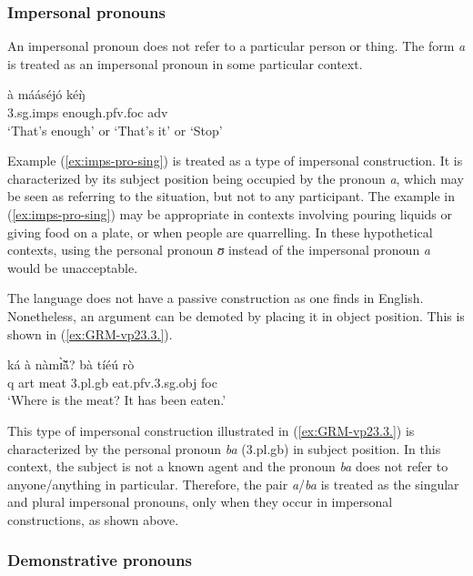 \begin{exe}
\begin{exe}
\begin{exe}
{\begin{exe}
\begin{exe}
\begin{exe}
\begin{exe}
\begin{exe}
\begin{exe}
\begin{exe}
\begin{xlist}
  
 \subsubsection{Impersonal pronouns}
 \label{sec:GRM-impers-pro}

An impersonal pronoun does  not refer to a particular person or thing. The form
{\it a} is treated as an impersonal pronoun  in some
particular context.

               
\begin{exe} 
\ex\label{ex:imps-pro-sing}
\gll à mááséjó kéŋ̀\\
     {\sc 3.sg.imps}  enough.{\sc pfv.foc} {\sc adv}\\
\glt `That's enough' or `That's it' or `Stop'
\z

Example (\ref{ex:imps-pro-sing}) is treated as a type of impersonal
construction. It is characterized by its  subject position being  occupied by 
the
pronoun {\it a}, which may be seen as referring to the situation,  but not to 
any
participant. The example in  (\ref{ex:imps-pro-sing}) may
be appropriate in contexts involving pouring  liquids or giving food on a plate,
or when people are quarrelling. In these hypothetical contexts, using the
personal
pronoun {\it ʊ} instead of  the  impersonal pronoun  {\it a} would be
unacceptable.  

The language does not have a passive construction as one finds in English.
Nonetheless,  an argument  can be demoted  by placing it in object position.
This is shown in (\ref{ex:GRM-vp23.3.}).

\ea\label{ex:GRM-vp23.3.}
\gll ká à nàmɪ̃̀ã́?  bà tíéú rò\\
      {\sc q} {\sc art} meat {\sc 3.pl.g}b  eat.{\sc pfv}.{\sc 3.sg.obj} {\sc
foc}\\
\glt  `Where is the meat? It has been eaten.'
\z


This type of impersonal
construction illustrated in  (\ref{ex:GRM-vp23.3.})  is characterized by the
personal pronoun {\it ba} ({\sc 3.pl.g}b)  in
subject position. In this context,  the subject is not a known agent and the 
pronoun {\it ba} does not refer to anyone/anything in 
particular. Therefore,  the pair {\it a}/{\it ba} is treated  as the singular 
and
plural impersonal pronouns, only when they occur in impersonal constructions, 
as shown above.






\subsubsection{Demonstrative pronouns}
\label{sec:GRM-demons-pro}



\end{exe}
\end{xlist}
\end{exe}
\end{exe}
\end{exe}
\end{exe}
\end{exe}
\end{exe}
\end{exe}}
\end{exe}
\end{exe}
\end{exe}
